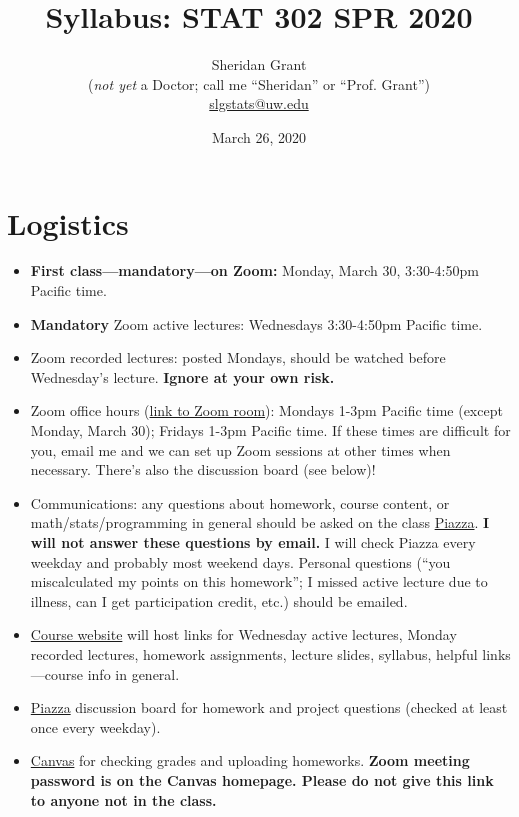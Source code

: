 \documentclass[12pt]{article}
\title{Syllabus: STAT 302 SPR 2020}
\author{Sheridan Grant\\(\textit{not yet} a Doctor; call me ``Sheridan'' or ``Prof. Grant'')\\\href{mailto:slgstats@uw.edu}{slgstats@uw.edu}}
\date{March 26, 2020}
\begin{document}
\sloppy

\maketitle

\section*{Logistics}

\begin{itemize}
	\item \textbf{First class---mandatory---on Zoom:} Monday, March 30, 3:30-4:50pm Pacific time.
	\item \textbf{Mandatory} Zoom active lectures: Wednesdays 3:30-4:50pm Pacific time.
	\item Zoom recorded lectures: posted Mondays, should be watched before Wednesday's lecture. \textbf{Ignore at your own risk.}
	\item Zoom office hours (\href{https://washington.zoom.us/j/7876861762?pwd=Nld6U2cvMWlUOVJUZ1B1UWVUbkFBQT09}{link to Zoom room}): Mondays 1-3pm Pacific time (except Monday, March 30); Fridays 1-3pm Pacific time. If these times are difficult for you, email me and we can set up Zoom sessions at other times when necessary. There's also the discussion board (see below)!
	\item Communications: any questions about homework, course content, or math/stats/programming in general should be asked on the class \href{https://piazza.com/washington/spring2020/stat302}{Piazza}. \textbf{I will not answer these questions by email.} I will check Piazza every weekday and probably most weekend days. Personal questions (``you miscalculated my points on this homework''; I missed active lecture due to illness, can I get participation credit, etc.) should be emailed.
	\item \href{https://sheridanlgrant.github.io/teaching/STAT302_SPR2020}{Course website} will host links for Wednesday active lectures, Monday recorded lectures, homework assignments, lecture slides, syllabus, helpful links---course info in general.
	\item \href{https://piazza.com/washington/spring2020/stat302}{Piazza} discussion board for homework and project questions (checked at least once every weekday).
	\item \href{https://canvas.uw.edu/}{Canvas} for checking grades and uploading homeworks. \textbf{Zoom meeting password is on the Canvas homepage. Please do not give this link to anyone not in the class.}
\end{itemize}
\end{document}
